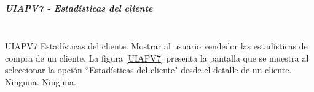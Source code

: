 \subparagraph{UIAPV7 - Estadísticas del cliente} ~\\

{UIAPV7} %
{Estadísticas del cliente.}  %
{Mostrar al usuario vendedor las estadísticas de compra de un cliente.} %
{La figura \ref{UIAPV7} presenta la pantalla que se muestra al seleccionar la opción ``Estadísticas del cliente" desde el detalle de un cliente.} %
{Ninguna.} %
{Ninguna.} %


